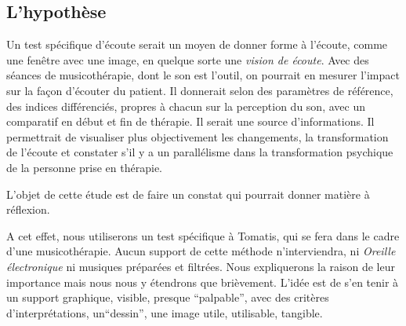 \subsection{L'hypothèse}

Un test spécifique d'écoute serait  un 
moyen de donner  forme à l'écoute, comme une fenêtre avec une  image, en quelque sorte une \emph{vision de écoute}. Avec  des séances de musicothérapie, dont  le son est l'outil, on pourrait en mesurer l'impact sur la façon d'écouter du patient. 
Il  donnerait selon des paramètres de référence, des indices différenciés, propres à chacun sur la perception du son, avec un comparatif en début et fin de thérapie. Il serait  une source d'informations. Il permettrait de visualiser plus objectivement
les changements, la transformation de l'écoute et constater s'il y a un parallélisme dans la transformation psychique  de la personne prise en thérapie.


 L'objet de cette étude est de faire un constat
qui pourrait donner matière à réflexion.

A cet effet, nous utiliserons un test spécifique à Tomatis, qui se fera dans le cadre d'une musicothérapie. Aucun support de cette méthode n'interviendra, ni \textit{\textsl{Oreille
électronique}} ni musiques préparées et filtrées. Nous expliquerons la raison de   leur importance mais nous nous y étendrons que brièvement. L'idée est de s'en tenir à un support
graphique, visible, presque ``palpable'', avec des critères
d'interprétations, un``dessin'', une image utile,
utilisable, tangible.


